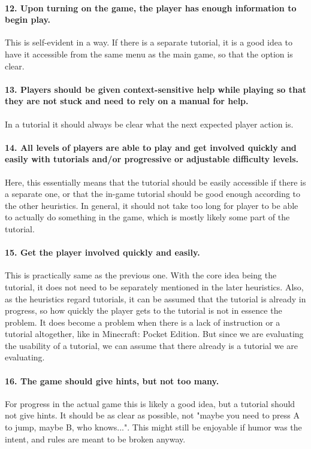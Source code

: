 \paragraph{12. Upon turning on the game, the player has enough information to begin play.} This is self-evident in a way. If there is a separate tutorial, it is a good idea to have it accessible from the same menu as the main game, so that the option is clear.

\paragraph{13. Players should be given context-sensitive help while playing so that they are not stuck and need to rely on a manual for help.} 
In a tutorial it should always be clear what the next expected player action is.

\paragraph{14. All levels of players are able to play and get involved quickly and easily with tutorials and/or progressive or adjustable difficulty levels. }
Here, this essentially means that the tutorial should be easily accessible if there is a separate one, or that the in-game tutorial should be good enough according to the other heuristics. In general, it should not take too long for player to be able to actually do something in the game, which is mostly likely some part of the tutorial.
 
\paragraph{15. Get the player involved quickly and easily.}
This is practically same as the previous one. With the core idea being the tutorial, it does not need to be separately mentioned in the later heuristics. Also, as the heuristics regard tutorials, it can be assumed that the tutorial is already in progress, so how quickly the player gets to the tutorial is not in essence the problem. It does become a problem when there is a lack of instruction or a tutorial altogether, like in Minecraft: Pocket Edition. But since we are evaluating the usability of a tutorial, we can assume that there already is a tutorial we are evaluating.

\paragraph{16. The game should give hints,  but not too many.} For progress in the actual game this is likely a good idea, but a tutorial should not give hints. It should be as clear as possible, not "maybe you need to press A to jump, maybe B, who knows...". This might still be enjoyable if humor was the intent, and rules are meant to be broken anyway.

